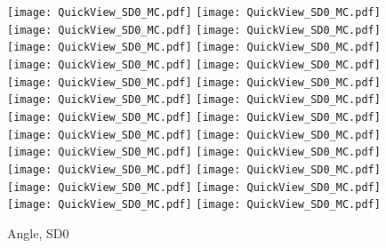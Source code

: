 \documentclass[amsmath,amssymb,aps,floatfix]{revtex4-1}
\begin{document}
\begin{figure}
   \centering
   \texttt{[image: QuickView\_SD0\_MC.pdf]}
   \texttt{[image: QuickView\_SD0\_MC.pdf]}
   \texttt{[image: QuickView\_SD0\_MC.pdf]}
   \texttt{[image: QuickView\_SD0\_MC.pdf]}\\
   \texttt{[image: QuickView\_SD0\_MC.pdf]}
   \texttt{[image: QuickView\_SD0\_MC.pdf]}
   \texttt{[image: QuickView\_SD0\_MC.pdf]}
   \texttt{[image: QuickView\_SD0\_MC.pdf]}\\
   \texttt{[image: QuickView\_SD0\_MC.pdf]}
   \texttt{[image: QuickView\_SD0\_MC.pdf]}
   \texttt{[image: QuickView\_SD0\_MC.pdf]}
   \texttt{[image: QuickView\_SD0\_MC.pdf]}\\
   \texttt{[image: QuickView\_SD0\_MC.pdf]}
   \texttt{[image: QuickView\_SD0\_MC.pdf]}
   \texttt{[image: QuickView\_SD0\_MC.pdf]}
   \texttt{[image: QuickView\_SD0\_MC.pdf]}\\
   \texttt{[image: QuickView\_SD0\_MC.pdf]}
   \texttt{[image: QuickView\_SD0\_MC.pdf]}
   \texttt{[image: QuickView\_SD0\_MC.pdf]}
   \texttt{[image: QuickView\_SD0\_MC.pdf]}\\
   \texttt{[image: QuickView\_SD0\_MC.pdf]}
   \texttt{[image: QuickView\_SD0\_MC.pdf]}
   \texttt{[image: QuickView\_SD0\_MC.pdf]}
   \texttt{[image: QuickView\_SD0\_MC.pdf]}\\
   \caption{Angle, SD0}
   \label{Figure:SD0Result}
\end{figure}
\end{document}
